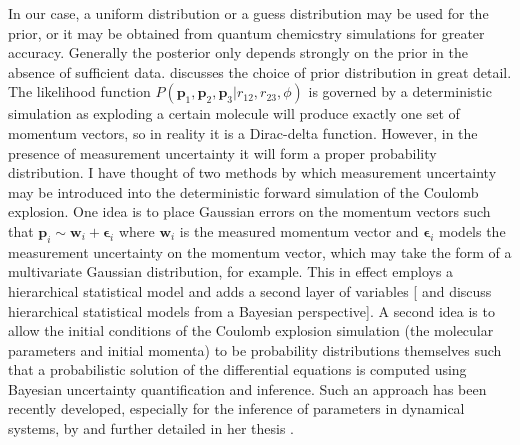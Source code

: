 In our case, a uniform distribution or a guess distribution may be used for the prior, or it may be obtained from quantum chemicstry simulations for greater accuracy. Generally the posterior only depends strongly on the prior in the absence of sufficient data. \citet{Gelman14} discusses the choice of prior distribution in great detail. The likelihood function $P(\mathbf{p}_1, \mathbf{p}_2, \mathbf{p}_3|r_{12}, r_{23}, \phi)$ is governed by a deterministic simulation as exploding a certain molecule will produce exactly one set of momentum vectors, so in reality it is a Dirac-delta function. However, in the presence of measurement uncertainty it will form a proper probability distribution. I have thought of two methods by which measurement uncertainty may be introduced into the deterministic forward simulation of the Coulomb explosion. One idea is to place Gaussian errors on the momentum vectors such that $\mathbf{p}_i \sim \mathbf{w}_i + \bm{\epsilon}_i$ where $\mathbf{w}_i$ is the measured momentum vector and $\bm{\epsilon}_i$ models the measurement uncertainty on the momentum vector, which may take the form of a multivariate Gaussian distribution, for example. This in effect employs a hierarchical statistical model and adds a second layer of variables [\citet[ch. 9]{Kruschke14} and \citet[ch. 5]{Gelman14} discuss hierarchical statistical models from a Bayesian perspective]. A second idea is to allow the initial conditions of the Coulomb explosion simulation (the molecular parameters and initial momenta) to be probability distributions themselves such that a probabilistic solution of the differential equations is computed using Bayesian uncertainty quantification and inference. Such an approach has been recently developed, especially for the inference of parameters in dynamical systems, by \citet{Chkrebtii16} and further detailed in her thesis \citep{Chkrebtii13}.

